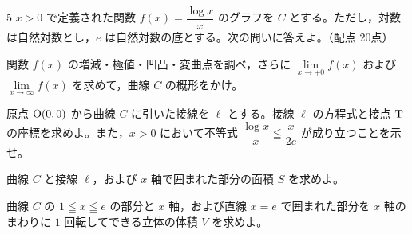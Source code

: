 \begin{monsheet}
\begin{daimon}{5}
$x>0$ で定義された関数 $f(x)=\dfrac{\log x}{x}$ のグラフを $C$ とする。ただし，対数は自然対数とし，$e$ は自然対数の底とする。次の問いに答えよ。\hfill（配点 20点）
\begin{shomon}
  \item 関数 $f(x)$ の増減・極値・凹凸・変曲点を調べ，さらに $\lim\limits_{x\to +0}f(x)$ および $\lim\limits_{x\to\infty}f(x)$ を求めて，曲線 $C$ の概形をかけ。
  \item 原点 $\mathrm{O}(0, 0)$ から曲線 $C$ に引いた接線を $\ell$ とする。接線 $\ell$ の方程式と接点 $\mathrm{T}$ の座標を求めよ。また，$x>0$ において不等式 $\dfrac{\log x}{x}\leqq\dfrac{x}{2e}$ が成り立つことを示せ。
  \item 曲線 $C$ と接線 $\ell$，および $x$ 軸で囲まれた部分の面積 $S$ を求めよ。
  \item 曲線 $C$ の $1\leqq x\leqq e$ の部分と $x$ 軸，および直線 $x=e$ で囲まれた部分を $x$ 軸のまわりに $1$ 回転してできる立体の体積 $V$ を求めよ。
\end{shomon}
\end{daimon}

\scratchpage
\end{monsheet}

